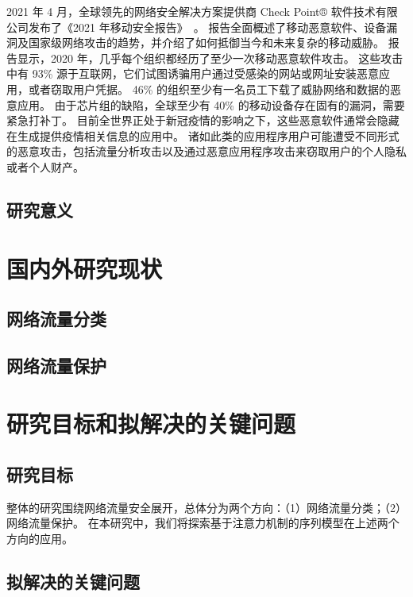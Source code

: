 \documentclass[degree=master,cjk-font=noto]{thuthesis}
\begin{document}
2021 年 4 月，全球领先的网络安全解决方案提供商 Check Point® 软件技术有限公司发布了《2021 年移动安全报告》~\cite{Attack2-report}。
报告全面概述了移动恶意软件、设备漏洞及国家级网络攻击的趋势，并介绍了如何抵御当今和未来复杂的移动威胁。
报告显示，2020 年，几乎每个组织都经历了至少一次移动恶意软件攻击。
这些攻击中有 93\% 源于互联网，它们试图诱骗用户通过受感染的网站或网址安装恶意应用，或者窃取用户凭据。
46\% 的组织至少有一名员工下载了威胁网络和数据的恶意应用。
由于芯片组的缺陷，全球至少有 40\% 的移动设备存在固有的漏洞，需要紧急打补丁。
目前全世界正处于新冠疫情的影响之下，这些恶意软件通常会隐藏在生成提供疫情相关信息的应用中。
诸如此类的应用程序用户可能遭受不同形式的恶意攻击，包括流量分析攻击以及通过恶意应用程序攻击来窃取用户的个人隐私或者个人财产。

\section{研究意义}

\chapter{国内外研究现状}

\section{网络流量分类}

\section{网络流量保护}

\chapter{研究目标和拟解决的关键问题}

\section{研究目标}

整体的研究围绕网络流量安全展开，总体分为两个方向：（1）网络流量分类；（2）网络流量保护。
在本研究中，我们将探索基于注意力机制的序列模型在上述两个方向的应用。

\section{拟解决的关键问题}
\end{document}
